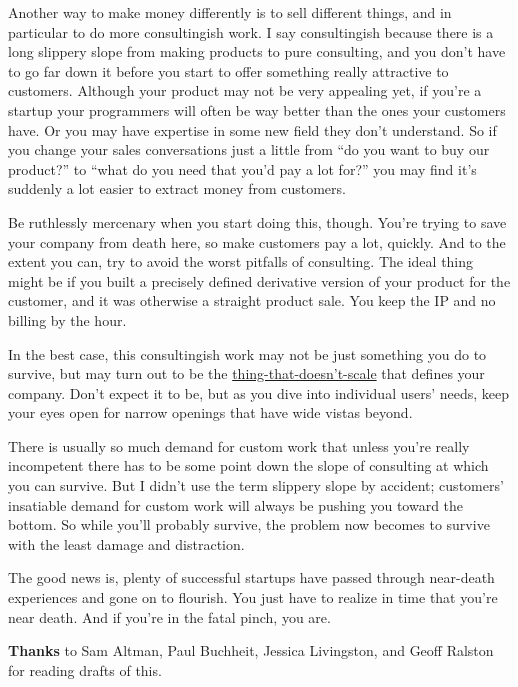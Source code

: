 Another way to make money differently is to sell different things, and
in particular to do more consultingish work. I say consultingish because
there is a long slippery slope from making products to pure consulting,
and you don't have to go far down it before you start to offer something
really attractive to customers. Although your product may not be very
appealing yet, if you're a startup your programmers will often be way
better than the ones your customers have. Or you may have expertise in
some new field they don't understand. So if you change your sales
conversations just a little from ``do you want to buy our product?'' to
``what do you need that you'd pay a lot for?'' you may find it's
suddenly a lot easier to extract money from customers.

Be ruthlessly mercenary when you start doing this, though. You're trying
to save your company from death here, so make customers pay a lot,
quickly. And to the extent you can, try to avoid the worst pitfalls of
consulting. The ideal thing might be if you built a precisely defined
derivative version of your product for the customer, and it was
otherwise a straight product sale. You keep the IP and no billing by the
hour.

In the best case, this consultingish work may not be just something you
do to survive, but may turn out to be the
\href{ds.html}{thing-that-doesn't-scale} that defines your company.
Don't expect it to be, but as you dive into individual users' needs,
keep your eyes open for narrow openings that have wide vistas beyond.

There is usually so much demand for custom work that unless you're
really incompetent there has to be some point down the slope of
consulting at which you can survive. But I didn't use the term slippery
slope by accident; customers' insatiable demand for custom work will
always be pushing you toward the bottom. So while you'll probably
survive, the problem now becomes to survive with the least damage and
distraction.

The good news is, plenty of successful startups have passed through
near-death experiences and gone on to flourish. You just have to realize
in time that you're near death. And if you're in the fatal pinch, you
are.


\textbf{Thanks} to Sam Altman, Paul Buchheit, Jessica Livingston, and
Geoff Ralston for reading drafts of this.